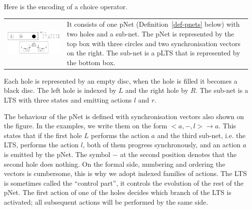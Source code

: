 \documentclass{elsarticle}
\newcommand{\LUDO}[1]{\textcolor{darkgreen}{#1}}
\begin{document}
\begin{example}\label{ex:CCSplus}
Here is the encoding of a choice operator.\\[1.5ex]
\noindent\begin{tabular}{cp{.45\linewidth}}
 \begin{minipage}{.49\linewidth}
 \includegraphics[width=1.0\linewidth]{XFIG/Choice.pdf}\vspace{-14ex}
\end{minipage} 
&
 It consists of one pNet (Definition~\ref{def-pnets} below) with two holes and a sub-net. The pNet is represented by the top box with three circles and two synchronisation vectors on the right. The sub-net is a pLTS that is represented by the bottom box. 
\end{tabular}
Each hole is represented by an empty disc, when the hole is filled it becomes a black disc.
The left hole is indexed by $L$ and the right hole by $R$. The sub-net is a LTS with three states and emitting actions $l$ and $r$. 

The behaviour of the pNet is defined with 
  synchronisation vectors also shown on the figure. In the examples, we write them on the form $<a,-,l>\to a$. This states that if the first hole $L$ performs the action $a$ and the third sub-net, i.e. the LTS, performs the action $l$, both of them progress synchronously, and an action $a$ is emitted by the pNet. The symbol $-$ at the second position denotes that the second hole does nothing. On the formal side, numbering and ordering the vectors is cumbersome, this is why we adopt indexed families of actions.
The LTS is sometimes called the ``control part'', it controls the evolution of the rest of the pNet. 
The first action  of one of  the holes decides which branch of the LTS is activated;
   all subsequent actions will be performed by the same side.

\end{example}
\end{document}
